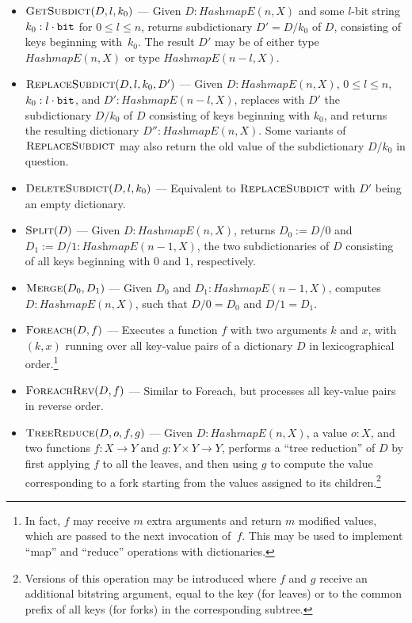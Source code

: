 \documentclass[12pt,oneside]{article}
\let\tp=\textit
\def\HashmapE{\tp{HashmapE}}
\begin{document}
\begin{itemize}
\item $\textsc{GetSubdict}(D,l,k_0)$ --- Given $D:\HashmapE(n,X)$ and some $l$-bit string $k_0:l\cdot{\tt bit}$ for $0\leq l\leq n$, returns subdictionary $D'=D/k_0$ of $D$, consisting of keys beginning with~$k_0$. The result $D'$ may be of either type $\HashmapE(n,X)$ or type $\HashmapE(n-l,X)$.
\item $\textsc{ReplaceSubdict}(D,l,k_0,D')$ --- Given $D:\HashmapE(n,X)$, $0\leq l\leq n$, $k_0:l\cdot{\tt bit}$, and $D':\HashmapE(n-l,X)$, replaces with $D'$ the subdictionary $D/k_0$ of $D$ consisting of keys beginning with $k_0$, and returns the resulting dictionary $D'':\HashmapE(n,X)$. Some variants of $\textsc{ReplaceSubdict}$ may also return the old value of the subdictionary $D/k_0$ in question.
\item $\textsc{DeleteSubdict}(D,l,k_0)$ --- Equivalent to $\textsc{ReplaceSubdict}$ with $D'$ being an empty dictionary.
\item $\textsc{Split}(D)$ --- Given $D:\HashmapE(n,X)$, returns $D_0:=D/0$ and $D_1:=D/1:\HashmapE(n-1,X)$, the two subdictionaries of $D$ consisting of all keys beginning with $0$ and $1$, respectively.
\item $\textsc{Merge}(D_0,D_1)$ --- Given $D_0$ and $D_1:\HashmapE(n-1,X)$, computes $D:\HashmapE(n,X)$, such that $D/0=D_0$ and $D/1=D_1$.
\item $\textsc{Foreach}(D,f)$ --- Executes a function $f$ with two arguments $k$ and $x$, with $(k,x)$ running over all key-value pairs of a dictionary $D$ in lexicographical order.\footnote{In fact, $f$ may receive $m$ extra arguments and return $m$ modified values, which are passed to the next invocation of~$f$. This may be used to implement ``map'' and ``reduce'' operations with dictionaries.}
\item $\textsc{ForeachRev}(D,f)$ --- Similar to {\sc Foreach}, but processes all key-value pairs in reverse order.
\item $\textsc{TreeReduce}(D,o,f,g)$ --- Given $D:\HashmapE(n,X)$, a value $o:X$, and two functions $f:X\to Y$ and $g:Y\times Y\to Y$, performs a ``tree reduction'' of $D$ by first applying $f$ to all the leaves, and then using $g$ to compute the value corresponding to a fork starting from the values assigned to its children.\footnote{Versions of this operation may be introduced where $f$ and $g$ receive an additional bitstring argument, equal to the key (for leaves) or to the common prefix of all keys (for forks) in the corresponding subtree.}
\end{itemize}
\end{document}
